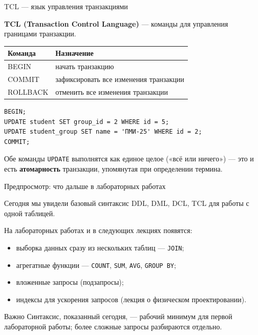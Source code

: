\documentclass[aspectratio=169]{beamer}
\begin{document}
\begin{frame}[fragile]{TCL — язык управления транзакциями}

\textbf{TCL (Transaction Control Language)} — команды для
управления границами транзакции.

\vspace{0.3cm}

\small
\begin{table}
\centering
\begin{tabular}{>{\ttfamily}p{}|p{}}
\toprule
\textnormal{Команда} & \textnormal{Назначение}\\
\midrule
BEGIN & начать транзакцию\\
COMMIT & зафиксировать все изменения транзакции\\
ROLLBACK & отменить все изменения транзакции\\
\bottomrule
\end{tabular}
\end{table}

\vspace{0.3cm}

\begin{verbatim}
BEGIN;
UPDATE student SET group_id = 2 WHERE id = 5;
UPDATE student_group SET name = 'ПМИ-25' WHERE id = 2;
COMMIT;
\end{verbatim}
\normalsize

\vspace{0.1cm}
\footnotesize
Обе команды \texttt{UPDATE} выполнятся как единое целое
(«всё или ничего») — это и есть \textbf{атомарность}
транзакции, упомянутая при определении термина.

\end{frame}


\begin{frame}{Предпросмотр: что дальше в лабораторных работах}

Сегодня мы увидели базовый синтаксис DDL, DML, DCL, TCL
для работы с одной таблицей.

\vspace{0.3cm}

На лабораторных работах и в следующих лекциях появятся:

\begin{itemize}
  \item выборка данных сразу из нескольких таблиц — \texttt{JOIN};
  \item агрегатные функции — \texttt{COUNT}, \texttt{SUM},
        \texttt{AVG}, \texttt{GROUP BY};
  \item вложенные запросы (подзапросы);
  \item индексы для ускорения запросов (лекция о физическом
        проектировании).
\end{itemize}

\vspace{0.3cm}

\begin{alertblock}{Важно}
Синтаксис, показанный сегодня, — рабочий минимум для первой
лабораторной работы; более сложные запросы разбираются
отдельно.
\end{alertblock}

\end{frame}
\end{document}
